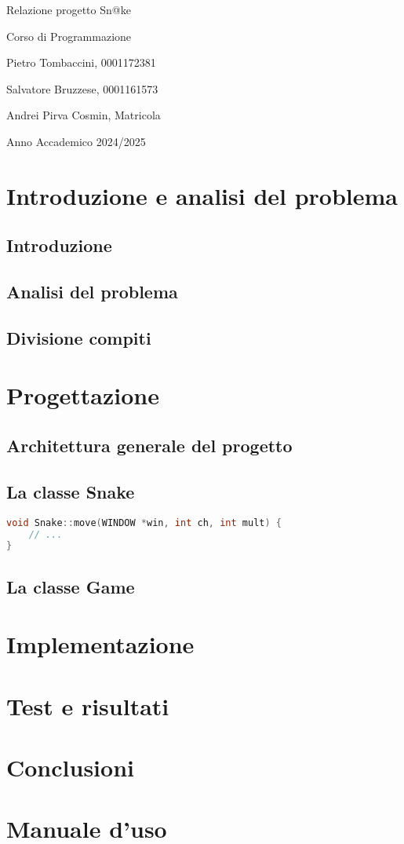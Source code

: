 \documentclass[a4paper,12pt]{report}
\begin{document}
\begin{titlepage}
    \centering
    {\Huge Relazione progetto Sn@ke\par}
    \vspace{1cm}
    {\large Corso di Programmazione\par}
    \vspace{1cm}
    {\large Pietro Tombaccini, 0001172381\par}
    {\large Salvatore Bruzzese, 0001161573\par}
    {\large Andrei Pirva Cosmin, Matricola\par}
    \vfill
    {\large Anno Accademico 2024/2025\par}
\end{titlepage}

\tableofcontents
\chapter{Introduzione e analisi del problema}
\section{Introduzione}
\section{Analisi del problema}
\section{Divisione compiti}

\chapter{Progettazione}
\section{Architettura generale del progetto}
\section{La classe Snake}
\begin{lstlisting}[language=C++, caption={Metodo move della classe Snake}]
void Snake::move(WINDOW *win, int ch, int mult) {
    // ...
}
\end{lstlisting}
\section{La classe Game}
\chapter{Implementazione}
\chapter{Test e risultati}
\chapter{Conclusioni}
\appendix
\chapter{Manuale d'uso}
\end{document}
